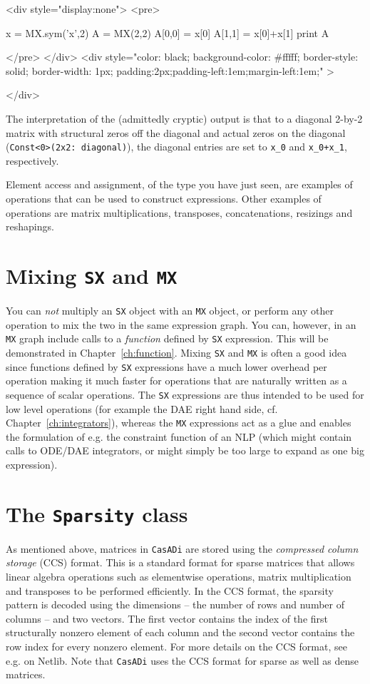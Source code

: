 \documentclass[a4paper,12pt]{book}
\newcommand{\CasADi}{\texttt{CasADi}\xspace}
\newcounter{pytexcount}
\newcounter{pytexsubcount}
\renewenvironment{pytexoutput}
{\addtocounter{pytexsubcount}{1}%
\begin{rawhtml}
<div style="display:none">
<pre>
\end{rawhtml}
}%
{\begin{rawhtml}
</pre>
</div>
<div style="color: black; background-color: \#fffff;  border-style: solid; border-width: 1px; padding:2px;padding-left:1em;margin-left:1em;" >\end{rawhtml}%
\verbatiminputeval{pytex_\alph{pytexcount}_\arabic{pytexsubcount}.log}%
\begin{rawhtml}
</div>
\end{rawhtml}
}
\begin{document}
\begin{pytexoutput}
x = MX.sym('x',2)
A = MX(2,2)
A[0,0] = x[0]
A[1,1] = x[0]+x[1]
print A
\end{pytexoutput}

The interpretation of the (admittedly cryptic) output is that to a diagonal 2-by-2 matrix with structural zeros off the diagonal and actual zeros on the diagonal (\lstinline{Const<0>(2x2: diagonal)}), the diagonal entries are set to \texttt{x\_0} and \texttt{x\_0+x\_1}, respectively.

Element access and assignment, of the type you have just seen, are examples of operations that can be used to construct expressions. Other examples of operations are matrix multiplications, transposes, concatenations, resizings and reshapings.

\section{Mixing \texttt{SX} and \texttt{MX}}
You can \emph{not} multiply an \texttt{SX} object with an \texttt{MX} object, or perform any other operation to mix the two in the same expression graph. You can, however, in an \texttt{MX} graph include calls to a \emph{function} defined by \texttt{SX} expression. This will be demonstrated in Chapter~\ref{ch:function}. Mixing \texttt{SX} and \texttt{MX} is often a good idea since functions defined by \texttt{SX} expressions have a much lower overhead per operation making it much faster for operations that are naturally written as a sequence of scalar operations. The \texttt{SX} expressions are thus intended to be used for low level operations (for example the DAE right hand side, cf. Chapter~\ref{ch:integrators}), whereas the \texttt{MX} expressions act as a glue and enables the formulation of e.g. the constraint function of an NLP (which might contain calls to ODE/DAE integrators, or might simply be too large to expand as one big expression).

\section{The \texttt{Sparsity} class} \label{sec:sparsity_class}
As mentioned above, matrices in \CasADi are stored using the \emph{compressed column storage} (CCS) format. This is a standard format for sparse matrices that allows linear algebra operations such as elementwise operations, matrix multiplication and transposes to be performed efficiently. In the CCS format, the sparsity pattern is decoded using the dimensions -- the number of rows and number of columns -- and two vectors. The first vector contains the index of the first structurally nonzero element of each column and the second vector contains the row index for every nonzero element. For more details on the CCS format, see e.g.  on Netlib. Note that \CasADi uses the CCS format for sparse as well as dense matrices.
\end{document}
